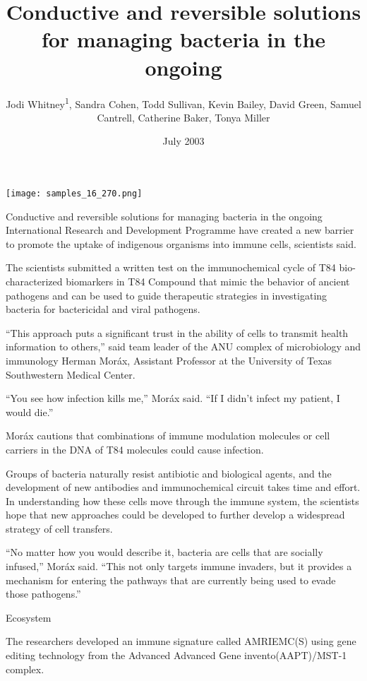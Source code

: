 \documentclass{article}
\title{Conductive and reversible solutions for managing bacteria in the ongoing}
\author{Jodi Whitney\textsuperscript{1},  Sandra Cohen,  Todd Sullivan,  Kevin Bailey,  David Green,  Samuel Cantrell,  Catherine Baker,  Tonya Miller}
\affil{\textsuperscript{1}Saint Joseph University, Lebanon}
\date{July 2003}
\begin{document}
\maketitle

\begin{center}
\begin{minipage}{0.75\linewidth}
\texttt{[image: samples\_16\_270.png]}
\end{minipage}
\end{center}

Conductive and reversible solutions for managing bacteria in the ongoing International Research and Development Programme have created a new barrier to promote the uptake of indigenous organisms into immune cells, scientists said.

The scientists submitted a written test on the immunochemical cycle of T84 bio-characterized biomarkers in T84 Compound that mimic the behavior of ancient pathogens and can be used to guide therapeutic strategies in investigating bacteria for bactericidal and viral pathogens.

“This approach puts a significant trust in the ability of cells to transmit health information to others,” said team leader of the ANU complex of microbiology and immunology Herman Moráx, Assistant Professor at the University of Texas Southwestern Medical Center.

“You see how infection kills me,” Moráx said. “If I didn’t infect my patient, I would die.”

Moráx cautions that combinations of immune modulation molecules or cell carriers in the DNA of T84 molecules could cause infection.

Groups of bacteria naturally resist antibiotic and biological agents, and the development of new antibodies and immunochemical circuit takes time and effort. In understanding how these cells move through the immune system, the scientists hope that new approaches could be developed to further develop a widespread strategy of cell transfers.

“No matter how you would describe it, bacteria are cells that are socially infused,” Moráx said. “This not only targets immune invaders, but it provides a mechanism for entering the pathways that are currently being used to evade those pathogens.”

Ecosystem

The researchers developed an immune signature called AMRIEMC(S) using gene editing technology from the Advanced Advanced Gene invento(AAPT)/MST-1 complex.
\end{document}
